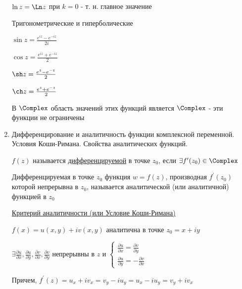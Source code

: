 \begin{enumerate}
    $\ln z = \Ln z$ при $k = 0$ - т. н. главное значение
    
     Тригонометрические и гиперболические

    \begin{multicols}{2}
        \begin{center}
            $\sin z = \frac{e^{iz} - e^{-iz}}{2i}$

            $\cos z = \frac{e^{iz} + e^{-iz}}{2}$

            $\sh z = \frac{e^{z} - e^{-z}}{2}$

            $\ch z = \frac{e^{z} + e^{-z}}{2}$
        \end{center}
    \end{multicols}

    В $\Complex$ область значений этих функций является $\Complex$ - эти функции не ограничены


    \item Дифференцирование и аналитичность функции комплексной переменной. Условия Коши-Римана. Свойства аналитических функций.

    \Def $f(z)$ называется \hyperlink{derivative}{дифференцируемой} в точке $z_0$, если $\exists f^\prime(z_0) \in \Complex$

    \Defs Дифференцируемая в точке $z_0$ функция $w = f(z)$, производная $f^\prime(z_0)$ которой непрерывна в $z_0$, называется аналитической (или аналитичной) функцией в $z_0$

    \begin{MyTheorem}
        \Ths \hyperlink{cauchy_riemann}{Критерий аналитичности (или Условие Коши-Римана)}
    
        \begin{center}
            $f(x) = u(x, y) + i v(x, y)$ аналитична в точке $z_0 = x + iy$ 
            
        
            $\exists \frac{\partial u}{\partial x}, \frac{\partial u}{\partial y}, \frac{\partial v}{\partial x}, \frac{\partial v}{\partial y}$ непрерывны в $z$ и
            $\begin{cases}\frac{\partial u}{\partial x} = \frac{\partial v}{\partial y} \\ \frac{\partial u}{\partial y} = -\frac{\partial v}{\partial x}\end{cases}$
        \end{center}
    
        Причем, $f^\prime(z) = u_x + i v_x = v_y - i u_y = u_x - i u_y = v_y + i v_x$
    \end{MyTheorem}
    

\end{enumerate}
